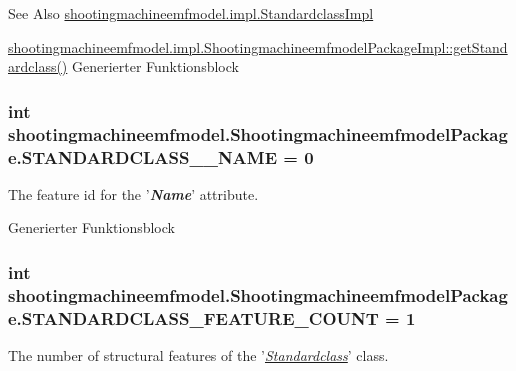 \begin{DoxySeeAlso}{See Also}
\hyperlink{classshootingmachineemfmodel_1_1impl_1_1_standardclass_impl}{shootingmachineemfmodel.\-impl.\-Standardclass\-Impl} 

\hyperlink{classshootingmachineemfmodel_1_1impl_1_1_shootingmachineemfmodel_package_impl_a5fd188e97c85df36a65343bbd588bb31}{shootingmachineemfmodel.\-impl.\-Shootingmachineemfmodel\-Package\-Impl\-::get\-Standardclass()} Generierter Funktionsblock 
\end{DoxySeeAlso}
\hypertarget{interfaceshootingmachineemfmodel_1_1_shootingmachineemfmodel_package_a06475d7d54d52ee19b2aaf4d5d73c738}{
\subsubsection[{S\-T\-A\-N\-D\-A\-R\-D\-C\-L\-A\-S\-S\-\_\-\-\_\-\-N\-A\-M\-E}]{\setlength{\rightskip}{0pt plus 5cm}int shootingmachineemfmodel.\-Shootingmachineemfmodel\-Package.\-S\-T\-A\-N\-D\-A\-R\-D\-C\-L\-A\-S\-S\-\_\-\-\_\-\-N\-A\-M\-E = 0}}\label{interfaceshootingmachineemfmodel_1_1_shootingmachineemfmodel_package_a06475d7d54d52ee19b2aaf4d5d73c738}
The feature id for the '{\itshape {\bfseries Name}}' attribute.

Generierter Funktionsblock  \hypertarget{interfaceshootingmachineemfmodel_1_1_shootingmachineemfmodel_package_a14037f66989b3107e402142df96ee9aa}{
\subsubsection[{S\-T\-A\-N\-D\-A\-R\-D\-C\-L\-A\-S\-S\-\_\-\-F\-E\-A\-T\-U\-R\-E\-\_\-\-C\-O\-U\-N\-T}]{\setlength{\rightskip}{0pt plus 5cm}int shootingmachineemfmodel.\-Shootingmachineemfmodel\-Package.\-S\-T\-A\-N\-D\-A\-R\-D\-C\-L\-A\-S\-S\-\_\-\-F\-E\-A\-T\-U\-R\-E\-\_\-\-C\-O\-U\-N\-T = 1}}\label{interfaceshootingmachineemfmodel_1_1_shootingmachineemfmodel_package_a14037f66989b3107e402142df96ee9aa}
The number of structural features of the '{\itshape \hyperlink{interfaceshootingmachineemfmodel_1_1_standardclass}{Standardclass}}' class.

